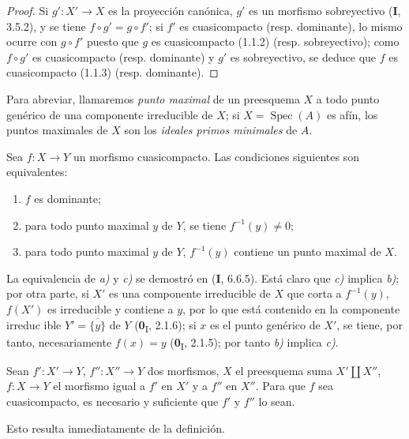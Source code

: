 \begin{proof}
Si $g':X'\to X$ es la proyección canónica, $g'$ es un morfismo sobreyectivo
(\textbf{I}, 3.5.2), y se tiene $f\circ g'=g\circ f'$; si $f'$ es cuasicompacto
(resp. dominante), lo mismo ocurre con $g\circ f'$ puesto que $g$ es
cuasicompacto (1.1.2) (resp. sobreyectivo); como $f\circ g'$ es cuasicompacto
(resp. dominante) y $g'$ es sobreyectivo, se deduce que $f$ es
cuasicompacto (1.1.3) (resp. dominante).
\end{proof}

Para abreviar, llamaremos \emph{punto maximal} de un preesquema $X$ a todo
punto genérico de una componente irreducible de $X$; si
$X=\operatorname{Spec}(A)$ es afín, los puntos maximales de $X$ son los
\emph{ideales primos minimales} de $A$.

\begin{proposition}[1.1.5]
\label{IV.1.1.5-fr}
Sea $f:X\to Y$ un morfismo cuasicompacto. Las condiciones siguientes son
equivalentes:
\begin{enumerate}
  \item[\textup{a)}] $f$ es dominante;
  \item[\textup{b)}] para todo punto maximal $y$ de $Y$, se tiene
  $f^{-1}(y)\neq 0$;
  \item[\textup{c)}] para todo punto maximal $y$ de $Y$, $f^{-1}(y)$ contiene un punto
  maximal de $X$.
\end{enumerate}
\end{proposition}

La equivalencia de \emph{a)} y \emph{c)} se demostró en (\textbf{I}, 6.6.5). Está
claro que \emph{c)} implica \emph{b)}; por otra parte, si $X'$ es una
componente irreducible de $X$ que corta a $f^{-1}(y)$, $f(X')$ es
irreducible y contiene a $y$, por lo que está contenido en la componente irreduc%
ible
$Y'=\overline{\{y\}}$ de $Y$ (\textbf{0}\textsubscript{I}, 2.1.6); si $x$ es el
punto genérico de $X'$, se tiene, por tanto, necesariamente $f(x)=y$
(\textbf{0}\textsubscript{I}, 2.1.5); por tanto \emph{b)} implica \emph{c)}.

\begin{proposition}[1.1.6]
\label{IV.1.1.6-fr}
Sean $f':X'\to Y$, $f'':X''\to Y$ dos morfismos, $X$ el preesquema suma
$X'\amalg X''$, $f:X\to Y$ el morfismo igual a $f'$ en $X'$ y a $f''$
en $X''$. Para que $f$ sea cuasicompacto, es necesario y suficiente que $f'$ y
$f''$ lo sean.
\end{proposition}

Esto resulta inmediatamente de la definición.

